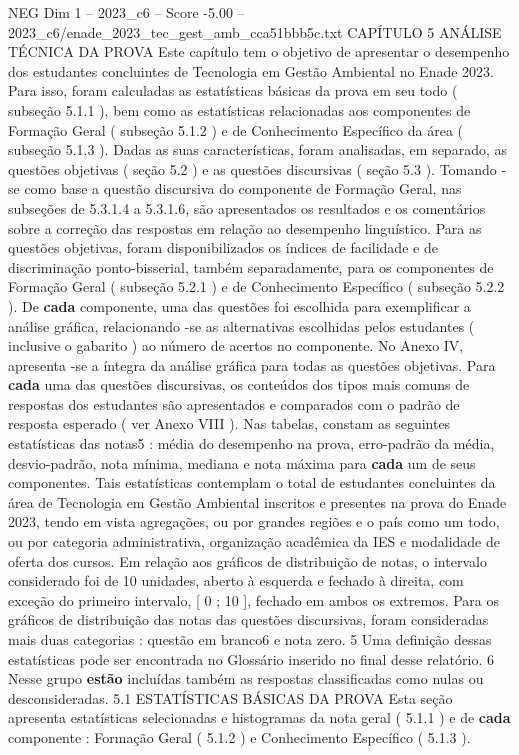 \begin{textsample}{NEG Dim 1 – 2023\_c6 – Score -5.00 – 2023\_c6/enade\_2023\_tec\_gest\_amb\_cca51bbb5c.txt}  \label{ex:f1_neg_202}
CAPÍTULO 5 ANÁLISE TÉCNICA DA PROVA Este capítulo tem o objetivo de apresentar o desempenho dos estudantes concluintes de Tecnologia em Gestão Ambiental no Enade 2023.
Para isso, foram calculadas as estatísticas básicas da prova em seu todo ( subseção 5.1.1 ), bem como as estatísticas relacionadas aos componentes de Formação Geral ( subseção 5.1.2 ) e de Conhecimento Específico da área ( subseção 5.1.3 ).
Dadas as suas características, foram analisadas, em separado, as questões objetivas ( seção 5.2 ) e as questões discursivas ( seção 5.3 ).
Tomando -se como base a questão discursiva do componente de Formação Geral, nas subseções de 5.3.1.4 a 5.3.1.6, são apresentados os resultados e os comentários sobre a correção das respostas em relação ao desempenho linguístico.
Para as questões objetivas, foram disponibilizados os índices de facilidade e de discriminação ponto-bisserial, também separadamente, para os componentes de Formação Geral ( subseção 5.2.1 ) e de Conhecimento Específico ( subseção 5.2.2 ).
De \textbf{cada} componente, uma das questões foi escolhida para exemplificar a análise gráfica, relacionando -se as alternativas escolhidas pelos estudantes ( inclusive o gabarito ) ao número de acertos no componente.
No Anexo IV, apresenta -se a íntegra da análise gráfica para todas as questões objetivas.
Para \textbf{cada} uma das questões discursivas, os conteúdos dos tipos mais comuns de respostas dos estudantes são apresentados e comparados com o padrão de resposta esperado ( ver Anexo VIII ).
Nas tabelas, constam as seguintes estatísticas das notas5 : média do desempenho na prova, erro-padrão da média, desvio-padrão, nota mínima, mediana e nota máxima para \textbf{cada} um de seus componentes.
Tais estatísticas contemplam o total de estudantes concluintes da área de Tecnologia em Gestão Ambiental inscritos e presentes na prova do Enade 2023, tendo em vista agregações, ou por grandes regiões e o país como um todo, ou por categoria administrativa, organização acadêmica da IES e modalidade de oferta dos cursos.
Em relação aos gráficos de distribuição de notas, o intervalo considerado foi de 10 unidades, aberto à esquerda e fechado à direita, com exceção do primeiro intervalo, [ 0 ; 10 ], fechado em ambos os extremos.
Para os gráficos de distribuição das notas das questões discursivas, foram consideradas mais duas categorias : questão em branco6 e nota zero. 5 Uma definição dessas estatísticas pode ser encontrada no Glossário inserido no final desse relatório. 6 Nesse grupo \textbf{estão} incluídas também as respostas classificadas como nulas ou desconsideradas. 5.1 ESTATÍSTICAS BÁSICAS DA PROVA Esta seção apresenta estatísticas selecionadas e histogramas da nota geral ( 5.1.1 ) e de \textbf{cada} componente : Formação Geral ( 5.1.2 ) e Conhecimento Específico ( 5.1.3 ).

\end{textsample}
